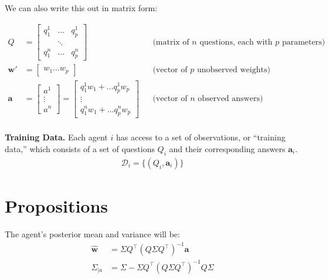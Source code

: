 \documentclass[
  11pt,
  letterpaper,
  DIV=11,
  numbers=noendperiod,
  oneside]{scrartcl}
\providecommand{\tightlist}{%
  \setlength{\itemsep}{0pt}\setlength{\parskip}{0pt}}\usepackage{longtable,booktabs,array}
\newcommand{\bm}[1]{\boldsymbol{#1}}
\begin{document}
We can also write this out in matrix form:

\[\begin{aligned}
      Q &= \begin{bmatrix}q_1^1 & \ldots & q^1_p \\ & \ddots & \\ q^n_1 & \ldots & q^n_p\end{bmatrix}
         && \text{(matrix of $n$ questions, each with $p$ parameters)} \\
      \bm{w}'  &= \begin{bmatrix}w_1 \ldots w_p\end{bmatrix}
         && \text{(vector of $p$ unobserved weights)}\\
      \bm{a}    &= \begin{bmatrix}a^1 \\ \vdots \\ a^n\end{bmatrix}
         = \begin{bmatrix}q_1^1 w_1 + \ldots q_p^1w_p \\ \vdots \\ q_1^n w_1 + \ldots q_p^n w_p\end{bmatrix}
         && \text{(vector of $n$ observed answers)}\\
   \end{aligned}
   \]

\textbf{Training Data.} Each agent \(i\) has access to a set of
observations, or ``training data,'' which consists of a set of questions
\(Q_i\) and their corresponding answers \(\bm{a}_i\). \[\begin{aligned}
      \mathcal{D}_i = \{ (Q_i, \bm{a}_i) \}
   \end{aligned}
   \]

\section{Propositions}\label{propositions}

\begin{description}
\tightlist
\item[Proposition 1 (Posterior for a given question).]
The agent's posterior mean and variance will be: \[\begin{aligned}
  \hat{\bm w}&= \Sigma Q^{\top}(Q\Sigma Q^{\top})^{-1}\bm a\\
  \Sigma_{\mid a} &=\Sigma-\Sigma Q^{\top}(Q\Sigma Q^{\top})^{-1}Q\Sigma
   \end{aligned}
   \]
\end{description}
\end{document}
